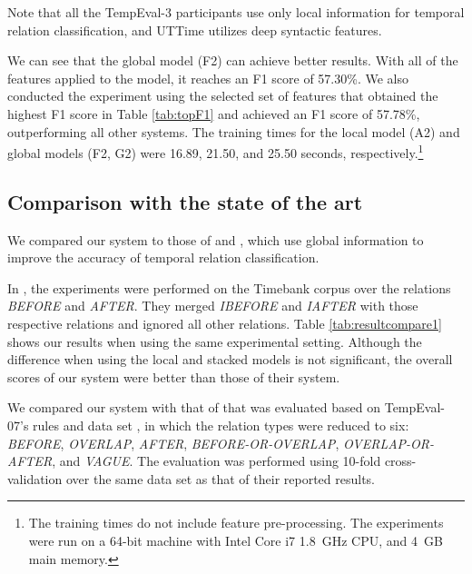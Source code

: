 \documentclass[english]{jnlp_1.4}
\begin{document}
Note that all the TempEval-3 participants use only local information for temporal relation classification, and UTTime  utilizes deep syntactic features.

We can see that the global model (F2) can achieve better results.
With all of the features applied to the model, it reaches an F1 score of 57.30\%. 
We also conducted the experiment using the selected set of features that obtained the highest F1 score in Table \ref{tab:topF1} and achieved an F1 score of 57.78\%, outperforming all other systems.
The training times for the local model (A2) and global models (F2, G2) were 16.89, 21.50, and 25.50 seconds, respectively.\footnote{The training times do not include feature pre-processing. The experiments were run on a 64-bit machine with Intel Core i7 1.8~GHz CPU, and 4~GB main memory.}

\begin{table}[t]
\label{tab:resultcompare}

\end{table}


\subsection{Comparison with the state of the art}

We compared our system to those of  and , which use global information to improve the accuracy of temporal relation classification.

In , the experiments were performed on the Timebank corpus over the relations \textit{BEFORE} and \textit{AFTER}.
They merged \textit{IBEFORE} and \textit{IAFTER} with those respective relations and ignored all other relations.
Table \ref{tab:resultcompare1} shows our results when using the same experimental setting.
Although the difference when using the local and stacked models is not significant, the overall scores of our system were better than those of their system.
 
We compared our system with that of  that was evaluated based on TempEval-07's rules and data set \cite{semeval2007}, in which the relation types were reduced to six: \emph{\footnotesize BEFORE}, \emph{\footnotesize OVERLAP}, \emph{\footnotesize AFTER}, \emph{\footnotesize BEFORE-OR-OVERLAP}, \emph{\footnotesize OVERLAP-OR-AFTER}, and \emph{\footnotesize VAGUE}.
The evaluation was performed using 10-fold cross-validation over the same data set as that of their reported results.
\end{document}
